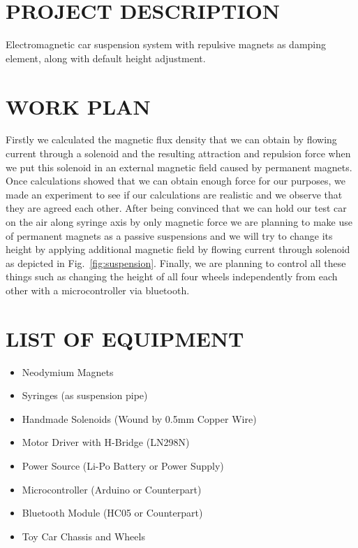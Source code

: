 \documentclass[a4paper, 11pt, conference]{IEEEtran}
\begin{document}
\section{PROJECT DESCRIPTION}
Electromagnetic car suspension system with repulsive magnets as damping element, along with default height adjustment.    

\section{WORK PLAN}
Firstly we calculated the magnetic flux density that we can obtain by flowing current through a solenoid and the resulting attraction and repulsion force when we put this solenoid in an external magnetic field caused by permanent magnets. Once calculations showed that we can obtain enough force for our purposes, we made an experiment to see if our calculations are realistic and we observe that they are agreed each other. After being convinced that we can hold our test car on the air along syringe axis by only magnetic force we are planning to make use of permanent magnets as a passive suspensions and we will try to change its height by applying additional magnetic field by flowing current through solenoid as depicted in Fig.~\ref{fig:suspension}. Finally, we are planning to control all these things such as changing the height of all four wheels independently from each other with a microcontroller via bluetooth.

\section{LIST OF EQUIPMENT}
\begin{itemize}
    \item Neodymium Magnets
    \item Syringes (as suspension pipe)
    \item Handmade Solenoids (Wound by 0.5mm Copper Wire)
    \item Motor Driver with H-Bridge (LN298N)
    \item Power Source (Li-Po Battery or Power Supply)
    \item Microcontroller (Arduino or Counterpart)
    \item Bluetooth Module (HC05 or Counterpart)
    \item Toy Car Chassis and Wheels
\end{itemize}

\printbibliography{}
\end{document}
